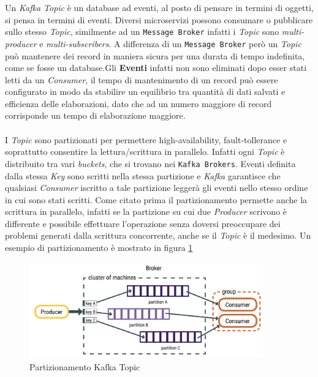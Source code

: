 Un \textit{Kafka Topic} è un database ad eventi, al posto di pensare in termini di oggetti, si pensa in termini di eventi.
Diversi microservizi possono consumare o pubblicare sullo stesso \textit{Topic}, similmente ad un \texttt{Message Broker} infatti i \textit{Topic} sono \textit{multi-producer} e \textit{multi-subscribers}.
A differenza di un \texttt{Message Broker} però un \textit{Topic} può mantenere dei record in maniera sicura per una durata di tempo indefinita, come se fosse un database.Gli \textbf{Eventi} infatti non sono eliminati dopo esser stati letti da un \textit{Consumer},
il tempo di mantenimento di un record può essere configurato in modo da stabilire un equilibrio tra quantità di dati salvati e efficienza delle elaborazioni, dato che ad un numero maggiore di record corrisponde un tempo di elaborazione maggiore.\\\\
I \textit{Topic} sono partizionati per permettere high-availability, fault-tollerance e soprattutto consentire la lettura/scrittura in parallelo.
Infatti ogni \textit{Topic} è distribuito tra vari \textit{buckets}, che si trovano nei \texttt{Kafka Brokers}.
Eventi definita dalla stessa \textit{Key} sono scritti nella stessa partizione e \textit{Kafka} garantisce che qualsiasi \textit{Consumer} iscritto a tale partizione leggerà gli eventi nello stesso ordine in cui sono stati scritti.
Come citato prima il partizionamento permette anche la scrittura in parallelo, infatti se la partizione su cui due \textit{Producer} scrivono è differente e possibile effettuare l'operazione senza doversi preoccupare dei problemi generati dalla scrittura concorrente, anche se il \textit{Topic} è il medesimo.
Un esempio di partizionamento è mostrato in figura \ref{fig:kafka_topic}
\begin{figure}[htbp]
    \centering
    \includegraphics[width=0.9\textwidth]{images/kafka/topic.png}
    \caption{Partizionamento Kafka Topic}
    \label{fig:kafka_topic}
\end{figure}

